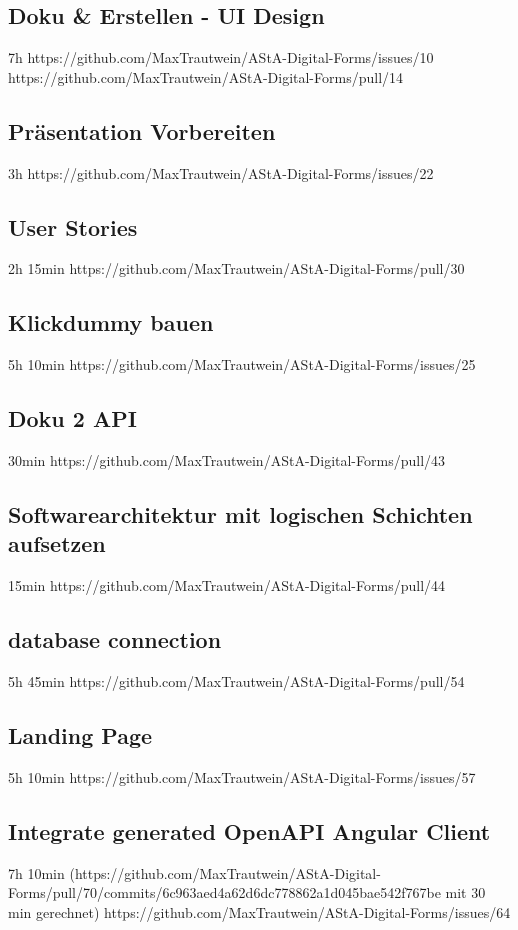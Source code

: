 \subsection{Doku & Erstellen - UI Design}
7h
https://github.com/MaxTrautwein/AStA-Digital-Forms/issues/10
https://github.com/MaxTrautwein/AStA-Digital-Forms/pull/14

\subsection{Präsentation Vorbereiten}
3h
https://github.com/MaxTrautwein/AStA-Digital-Forms/issues/22
\subsection{User Stories}
2h 15min
https://github.com/MaxTrautwein/AStA-Digital-Forms/pull/30

\subsection{Klickdummy bauen}
5h 10min
https://github.com/MaxTrautwein/AStA-Digital-Forms/issues/25


\subsection{Doku 2 API}
30min
https://github.com/MaxTrautwein/AStA-Digital-Forms/pull/43

\subsection{Softwarearchitektur mit logischen Schichten aufsetzen }
15min
https://github.com/MaxTrautwein/AStA-Digital-Forms/pull/44
\subsection{database connection}
5h 45min
https://github.com/MaxTrautwein/AStA-Digital-Forms/pull/54
\subsection{Landing Page}
5h 10min
https://github.com/MaxTrautwein/AStA-Digital-Forms/issues/57
\subsection{Integrate generated OpenAPI Angular Client}
7h 10min
(https://github.com/MaxTrautwein/AStA-Digital-Forms/pull/70/commits/6c963aed4a62d6dc778862a1d045bae542f767be mit 30 min gerechnet)
https://github.com/MaxTrautwein/AStA-Digital-Forms/issues/64
